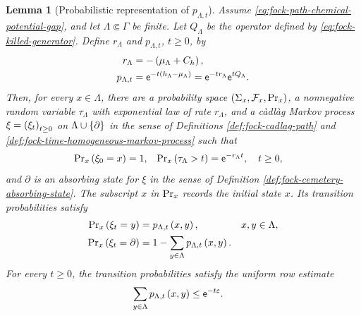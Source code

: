 \documentclass[11pt,a4paper]{article}
\theoremstyle{plain}
\newtheorem{lem}[thm]{Lemma}
\theoremstyle{definition}
\theoremstyle{remark}
\begin{document}
\begin{lem}[Probabilistic representation of $p_{\Lambda,t}$]\label{lem:fock-killed-walk-kernel}
Assume \eqref{eq:fock-path-chemical-potential-gap}, and let $\Lambda\Subset\Gamma$ be finite.
Let $Q_{\Lambda}$ be the operator defined by \eqref{eq:fock-killed-generator}.
Define $r_{\Lambda}$ and $p_{\Lambda,t}$, $t\geq0$, by
\begin{equation}
\begin{aligned}
r_{\Lambda}
& =
-\rbk{\smchemicalpotential_{\Lambda}+C_h},
\\
p_{\Lambda,t}
& =
\napiernum^{-t\rbk{\physham[h]_{\Lambda}-\smchemicalpotential_{\Lambda}}}
=
\napiernum^{-tr_{\Lambda}}\napiernum^{tQ_{\Lambda}}.
\end{aligned}
\label{eq:fock-killed-kernel-definition}
\end{equation}
Then, for every $x\in\Lambda$, there are a probability space
$\left( \Sigma_{x},\mathcal{F}_{x},\mathrm{Pr}_x \right)$, a nonnegative random variable
$\tau_{\Lambda}$ with exponential law of rate $r_{\Lambda}$, and a càdlàg Markov process
$\xi=\seq{\xi_t}{t\geq0}$ on $\Lambda\cup\left\{ \partial \right\}$ in the sense of
Definitions \ref{def:fock-cadlag-path} and \ref{def:fock-time-homogeneous-markov-process} such that
$$\begin{aligned}
\mathrm{Pr}_x \left( \xi_0=x \right)
& =
1,
&
\mathrm{Pr}_x \left( \tau_{\Lambda}>t \right)
& =
\mathsf{e}^{-r_{\Lambda}t},
\quad
t\geq0,
\end{aligned}$$
and $\partial$ is an absorbing state for $\xi$ in the sense of
Definition \ref{def:fock-cemetery-absorbing-state}.
The subscript $x$ in $\mathrm{Pr}_x$ records the initial state $x$.
Its transition probabilities satisfy
\begin{equation}
\begin{aligned}
\mathrm{Pr}_x \left( \xi_t=y \right)
& =
p_{\Lambda,t} \left( x,y \right),
&
x,y
& \in
\Lambda,
\\
\mathrm{Pr}_x \left( \xi_t=\partial \right)
& =
1-
\sum_{y\in\Lambda}p_{\Lambda,t} \left( x,y \right).
\end{aligned}
\label{eq:fock-killed-walk-transition}
\end{equation}
For every $t\geq0$, the transition probabilities satisfy the uniform row estimate
\begin{equation}
\begin{aligned}
\sum_{y \in \Lambda}p_{\Lambda,t} \left( x,y \right)
& \leq
\mathsf{e}^{-t\varepsilon}.
\end{aligned}
\label{eq:fock-killed-walk-row-bound}
\end{equation}
\end{lem}
\end{document}
